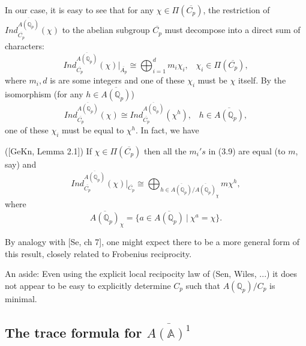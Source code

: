 In our case, it is easy to see that for any
$\chi \in \Pi (\overline{C_p})$,
the restriction of
$Ind_{\overline{C_p}}^{\overline{A({\mathbb{Q}}_p)}}(\chi )$
to the abelian subgroup
$\overline{C_p}$ must decompose into a direct sum of
characters: 
\begin{equation}
Ind_{\overline{C_p}}^{\overline{A({\mathbb{Q}}_p)}}(\chi )|_{\overline{A_p}}
\cong \bigoplus_{i=1}^dm_i\chi _i,
\;\;\;\chi _i\in \Pi (\overline{C_p}),
\end{equation}
where $m_i,d$ is are some integers and
one of these $\chi _i$ must be $\chi $ itself. By the isomorphism
(for any $h\in \overline{A({\mathbb{Q}}_p)}$)
\begin{equation}
Ind_{\overline{C_p}}^{\overline{A({\mathbb{Q}}_p)}}(\chi )
\cong Ind_{\overline{C_p}}^{\overline{A({\mathbb{Q}}_p)}}(\chi ^h),
\;\;\;h\in \overline{A({\mathbb{Q}}_p)},
\end{equation}
one of these $\chi _i$ must be equal to $\chi ^h$.
In fact, we have

\begin{lemma} ([GeKn, Lemma 2.1])
If $\chi \in \Pi (\overline{C_p})$ then all the $m_i's$ in (3.9) are
equal (to $m$, say) and
\[
Ind_{\overline{C_p}}^{\overline{A({\mathbb{Q}}_p)}}(\chi )|_{\overline{C_p}}
\cong \bigoplus_{h\in \overline{A({\mathbb{Q}}_p)}
/\overline{A({\mathbb{Q}}_p)}_{\chi}}
m\chi ^h,
\]
where
\[
\overline{A({\mathbb{Q}}_p)}_{\chi}
=\{a\in\overline{A({\mathbb{Q}}_p)} \ |\ \chi^a=\chi\}.
\]
\end{lemma}

\begin{remark} By analogy with [Se, ch 7], one might expect there to
be a more general form of this result, closely related to
Frobenius reciprocity.
\end{remark}
\begin{remark}
An aside: Even using the explicit local recipocity law of
(Sen, Wiles, ...) it does not appear to be
easy to explicitly determine $C_p$
such that $A({\mathbb{Q}}_p)/C_p$ is minimal.
\end{remark}


\subsection{The trace formula for \emph{$\overline{A({\mathbb{A}})^1}$}}

